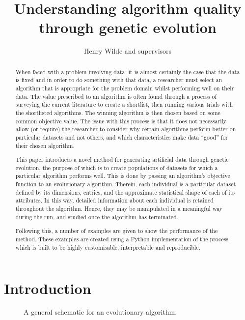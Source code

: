 \documentclass[10pt]{article}
\title{Understanding algorithm quality through genetic evolution}
\author{Henry Wilde and supervisors}
\date{}
\newlength{\imgwidth}
\newcommand{\inputtikz}[3][\imgwidth]{%
    \begin{figure}[htbp]
        \centering
        \resizebox{#1}{!}{%
            
        }
        \caption{#3}
    \end{figure}
}
\begin{document}
\maketitle%
\bigskip%
\begin{abstract}
    When faced with a problem involving data, it is almost certainly the case
    that the data is fixed and in order to do something with that data, a
    researcher must select an algorithm that is appropriate for the problem
    domain whilst performing well on their data. The value prescribed to an
    algorithm is often found through a process of surveying the current
    literature to create a shortlist, then running various trials with the
    shortlisted algorithms. The winning algorithm is then chosen based on some
    common objective value. The issue with this process is that it does not
    necessarily allow (or require) the researcher to consider why certain
    algorithms perform better on particular datasets and not others, and which
    characteristics make data ``good'' for their chosen algorithm.

    This paper introduces a novel method for generating artificial data through
    genetic evolution, the purpose of which is to create populations of datasets
    for which a particular algorithm performs well. This is done by passing an
    algorithm's objective function to an evolutionary algorithm. Therein, each
    individual is a particular dataset defined by its dimensions, entries, and
    the approximate statistical shape of each of its attributes. In this way,
    detailed information about each individual is retained throughout the
    algorithm. Hence, they may be manipulated in a meaningful way during the
    run, and studied once the algorithm has terminated.

    Following this, a number of examples are given to show the performance of
    the method. These examples are created using a Python implementation of the
    process which is built to be highly customisable, interpretable and
    reproducible.
\end{abstract}

\newpage%
\section{Introduction}\label{section:introduction}

\inputtikz{tex/flowchart.tex}{%
    A general schematic for an evolutionary algorithm.
}
\end{document}
